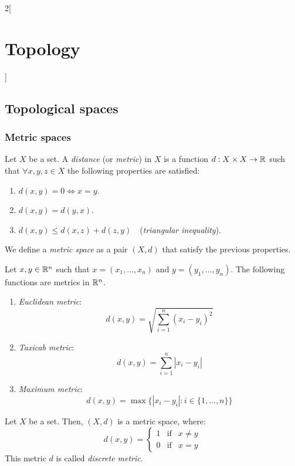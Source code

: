 \documentclass[../../../main.tex]{subfiles}
\begin{document}
\begin{multicols}{2}[\section{Topology}]
  \subsection{Topological spaces}
  \subsubsection{Metric spaces}
  \begin{definition}
    Let $X$ be a set. A \textit{distance} (or \textit{metric}) in $X$ is a function $d:X\times X\rightarrow\mathbb{R} $ such that $\forall x,y,z\in X$ the following properties are satisfied:
    \begin{enumerate}
      \item $d(x,y)=0\iff x=y$.
      \item $d(x,y)=d(y,x)$.
      \item $d(x,y)\leq d(x,z)+d(z,y)\quad$(\textit{triangular inequality}).
    \end{enumerate}
    We define a \textit{metric space} as a pair $(X,d)$ that satisfy the previous properties.
  \end{definition}
  \begin{prop}
    Let $x,y\in\mathbb{R}^n$ such that $x=(x_1,\ldots,x_n)$ and $y=(y_1,\ldots,y_n)$. The following functions are metrics in $\mathbb{R}^n$.
    \begin{enumerate}
      \item \textit{Euclidean metric}: $$d(x,y)=\sqrt{\sum_{i=1}^n{(x_i-y_i)}^2}$$
      \item \textit{Taxicab metric}: $$d(x,y)=\sum_{i=1}^n|x_i-y_i|$$
      \item \textit{Maximum metric}: $$d(x,y)=\max\{|x_i-y_i|:i\in\{1,\ldots,n\}\}$$
    \end{enumerate}
  \end{prop}
  \begin{prop}
    Let $X$ be a set. Then, $(X,d)$ is a metric space, where: $$d(x,y)=
      \left\{\begin{array}{lcc}
        1 & \text{if} & x\ne y \\
        0 & \text{if} & x= y
      \end{array}\right.
    $$
    This metric $d$ is called \textit{discrete metric}.
  \end{prop}

\end{multicols}
\end{document}
